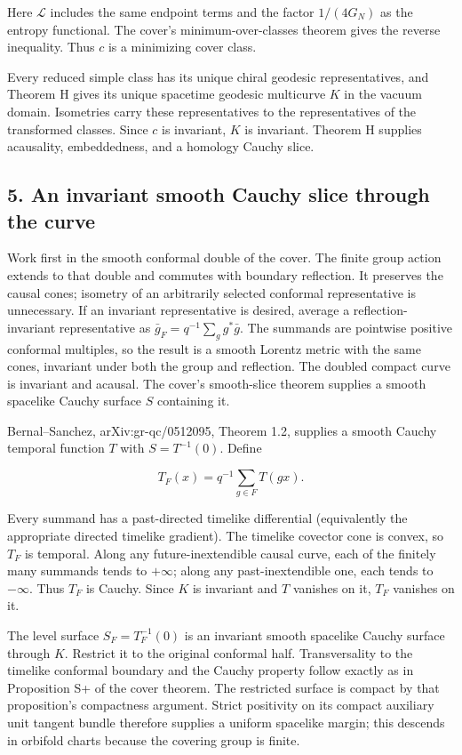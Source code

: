 \documentclass[11pt]{article}
\begin{document}
Here \(\mathcal L\) includes the same endpoint terms and the factor
\(1/(4G_N)\) as the entropy functional. The cover's minimum-over-classes
theorem gives the reverse inequality. Thus \(c\) is a minimizing cover
class.

Every reduced simple class has its unique chiral geodesic
representatives, and Theorem H gives its unique spacetime geodesic
multicurve \(K\) in the vacuum domain. Isometries carry these
representatives to the representatives of the transformed classes. Since
\(c\) is invariant, \(K\) is invariant. Theorem H supplies acausality,
embeddedness, and a homology Cauchy slice.

\subsection{5. An invariant smooth Cauchy slice through the
curve}\label{an-invariant-smooth-cauchy-slice-through-the-curve}

Work first in the smooth conformal double of the cover. The finite group
action extends to that double and commutes with boundary reflection. It
preserves the causal cones; isometry of an arbitrarily selected
conformal representative is unnecessary. If an invariant representative
is desired, average a reflection-invariant representative as
\(\bar g_F=q^{-1}\sum_g g^*\bar g\). The summands are pointwise positive
conformal multiples, so the result is a smooth Lorentz metric with the
same cones, invariant under both the group and reflection. The doubled
compact curve is invariant and acausal. The cover's smooth-slice theorem
supplies a smooth spacelike Cauchy surface \(S\) containing it.

Bernal--Sanchez, arXiv:gr-qc/0512095, Theorem 1.2, supplies a smooth
Cauchy temporal function \(T\) with \(S=T^{-1}(0)\). Define

\[
 T_F(x)=q^{-1}\sum_{g\in F}T(gx).
 \tag{5}
\]

Every summand has a past-directed timelike differential (equivalently
the appropriate directed timelike gradient). The timelike covector cone
is convex, so \(T_F\) is temporal. Along any future-inextendible causal
curve, each of the finitely many summands tends to \(+\infty\); along
any past-inextendible one, each tends to \(-\infty\). Thus \(T_F\) is
Cauchy. Since \(K\) is invariant and \(T\) vanishes on it, \(T_F\)
vanishes on it.

The level surface \(S_F=T_F^{-1}(0)\) is an invariant smooth spacelike
Cauchy surface through \(K\). Restrict it to the original conformal
half. Transversality to the timelike conformal boundary and the Cauchy
property follow exactly as in Proposition S+ of the cover theorem. The
restricted surface is compact by that proposition's compactness
argument. Strict positivity on its compact auxiliary unit tangent bundle
therefore supplies a uniform spacelike margin; this descends in orbifold
charts because the covering group is finite.
\end{document}
